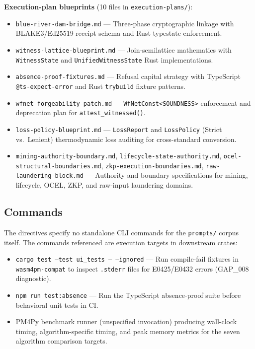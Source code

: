 \textbf{Execution-plan blueprints} (10 files in \texttt{execution-plans/}):
\begin{itemize}
  \item \texttt{blue-river-dam-bridge.md} --- Three-phase cryptographic linkage with
    BLAKE3/Ed25519 receipt schema and Rust typestate enforcement.
  \item \texttt{witness-lattice-blueprint.md} --- Join-semilattice mathematics with
    \texttt{WitnessState} and \texttt{UnifiedWitnessState} Rust implementations.
  \item \texttt{absence-proof-fixtures.md} --- Refusal capital strategy with
    TypeScript \texttt{@ts-expect-error} and Rust \texttt{trybuild} fixture patterns.
  \item \texttt{wfnet-forgeability-patch.md} --- \texttt{WfNetConst<SOUNDNESS>}
    enforcement and deprecation plan for \texttt{attest\_witnessed()}.
  \item \texttt{loss-policy-blueprint.md} --- \texttt{LossReport} and
    \texttt{LossPolicy} (Strict vs.\ Lenient) thermodynamic loss auditing for
    cross-standard conversion.
  \item \texttt{mining-authority-boundary.md}, \texttt{lifecycle-state-authority.md},
    \texttt{ocel-structural-boundaries.md}, \texttt{zkp-execution-boundaries.md},
    \texttt{raw-laundering-block.md} --- Authority and boundary specifications for
    mining, lifecycle, OCEL, ZKP, and raw-input laundering domains.
\end{itemize}

\subsection{Commands}
\label{sec:prompts-implementation-commands}

The directives specify no standalone CLI commands for the \texttt{prompts/} corpus
itself. The commands referenced are execution targets in downstream crates:

\begin{itemize}
  \item \texttt{cargo test --test ui\_tests -- --ignored} --- Run compile-fail
    fixtures in \texttt{wasm4pm-compat} to inspect \texttt{.stderr} files for
    E0425/E0432 errors (GAP\_008 diagnostic).
  \item \texttt{npm run test:absence} --- Run the TypeScript absence-proof suite
    before behavioral unit tests in CI.
  \item PM4Py benchmark runner (unspecified invocation) producing wall-clock timing,
    algorithm-specific timing, and peak memory metrics for the seven algorithm
    comparison targets.
\end{itemize}

